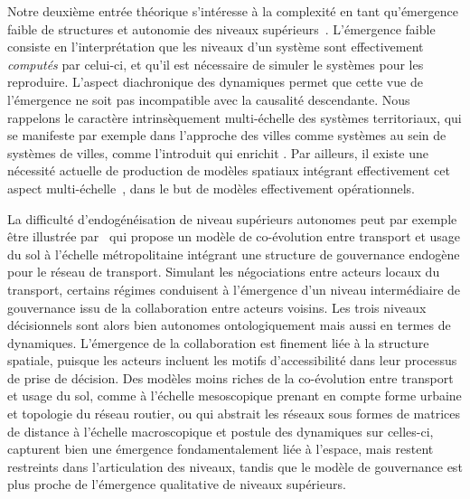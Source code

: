 \documentclass[11pt]{article}
\begin{document}
Notre deuxième entrée théorique s'intéresse à la complexité en tant qu'émergence faible de structures et autonomie des niveaux supérieurs~\citep{bedau2002downward}. L'émergence faible consiste en l'interprétation que les niveaux d'un système sont effectivement \emph{computés} \citep{morin1980methode} par celui-ci, et qu'il est nécessaire de simuler le systèmes pour les reproduire. L'aspect diachronique des dynamiques permet que cette vue de l'émergence ne soit pas incompatible avec la causalité descendante. Nous rappelons le caractère intrinsèquement multi-échelle des systèmes territoriaux, qui se manifeste par exemple dans l'approche des villes comme systèmes au sein de systèmes de villes, comme l'introduit \cite{pumain1997pour} qui enrichit \cite{berry1964cities}. Par ailleurs, il existe une nécessité actuelle de production de modèles spatiaux intégrant effectivement cet aspect multi-échelle~\citep{rozenblat2018conclusion}, dans le but de modèles effectivement opérationnels.

La difficulté d'endogénéisation de niveau supérieurs autonomes peut par exemple être illustrée par~\cite{lenechet:halshs-01272236} qui propose un modèle de co-évolution entre transport et usage du sol à l'échelle métropolitaine intégrant une structure de gouvernance endogène pour le réseau de transport. Simulant les négociations entre acteurs locaux du transport, certains régimes conduisent à l'émergence d'un niveau intermédiaire de gouvernance issu de la collaboration entre acteurs voisins. Les trois niveaux décisionnels sont alors bien autonomes ontologiquement mais aussi en termes de dynamiques. L'émergence de la collaboration est finement liée à la structure spatiale, puisque les acteurs incluent les motifs d'accessibilité dans leur processus de prise de décision. Des modèles moins riches de la co-évolution entre transport et usage du sol, comme \cite{raimbault2018urban} à l'échelle mesoscopique prenant en compte forme urbaine et topologie du réseau routier, ou \cite{raimbault2018modeling} qui abstrait les réseaux sous formes de matrices de distance à l'échelle macroscopique et postule des dynamiques sur celles-ci, capturent bien une émergence fondamentalement liée à l'espace, mais restent restreints dans l'articulation des niveaux, tandis que le modèle de gouvernance est plus proche de l'émergence qualitative de niveaux supérieurs.
\end{document}
